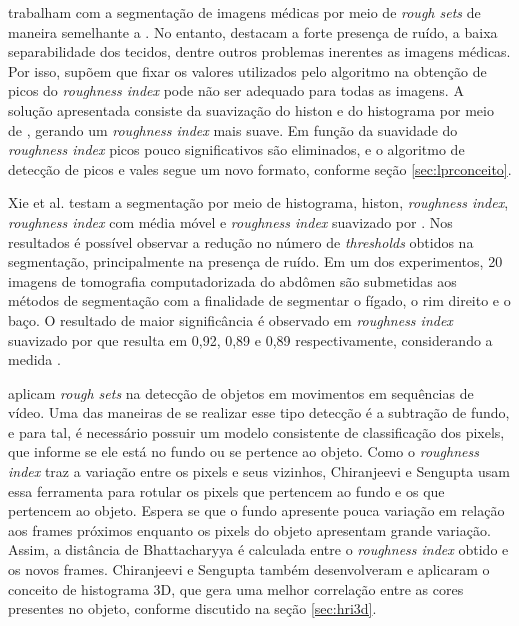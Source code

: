  trabalham com a segmentação de imagens médicas por meio de \textit{rough sets} de maneira semelhante a . No entanto, destacam a forte presença de ruído, a baixa separabilidade dos tecidos, dentre outros problemas inerentes as imagens médicas. Por isso,  supõem que fixar os valores utilizados pelo algoritmo na obtenção de picos do \textit{roughness index} pode não ser adequado para todas as imagens. A solução apresentada consiste da suavização do histon e do histograma por meio de , gerando um \textit{roughness index} mais suave. Em função da suavidade do \textit{roughness index} picos pouco significativos são eliminados, e o algoritmo de detecção de picos e vales segue um novo formato, conforme seção \ref{sec:lprconceito}.

Xie et al. testam a segmentação por meio de histograma, histon, \textit{roughness index}, \textit{roughness index} com média móvel e \textit{roughness index} suavizado por . Nos resultados é possível observar a redução no número de \textit{thresholds} obtidos na segmentação, principalmente na presença de ruído. Em um dos experimentos, 20 imagens de tomografia computadorizada do abdômen 
são submetidas aos métodos de segmentação com a finalidade de segmentar o fígado, o rim direito e o baço. O resultado de maior significância é observado em \textit{roughness index} suavizado por  que resulta em 0,92, 0,89 e 0,89 respectivamente, considerando a medida .


 aplicam \textit{rough sets} na detecção de objetos em movimentos em sequências de vídeo. Uma das maneiras de se realizar esse tipo detecção é a subtração de fundo, e para tal, é necessário possuir um modelo consistente de classificação dos pixels, que informe se ele está no fundo ou se pertence ao objeto. Como o \textit{roughness index} traz a variação entre os pixels e seus vizinhos, Chiranjeevi e Sengupta usam essa ferramenta para rotular os pixels que pertencem ao fundo e os que pertencem ao objeto. Espera se que o fundo apresente pouca variação em relação aos frames próximos enquanto os pixels do  objeto apresentam grande variação. Assim, a distância de Bhattacharyya é calculada entre o \textit{roughness index} obtido e os novos frames. Chiranjeevi e Sengupta também desenvolveram e aplicaram o conceito de histograma 3D, que gera uma melhor correlação entre as cores presentes no objeto, conforme discutido na seção \ref{sec:hri3d}. 

